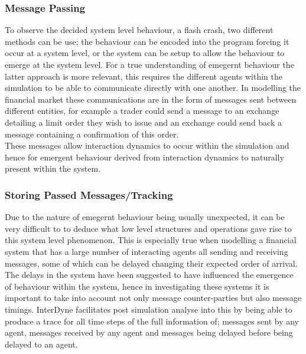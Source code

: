 \documentclass{article}
\begin{document}
\subsubsection{Message Passing}
To observe the decided system level behaviour, a flash crash, two different methods can be use; the behaviour can be encoded into the program forcing it occur at a system level, or the system can be setup to allow the behaviour to emerge at the system level. For a true understanding of emegernt behaviour the latter approach is more relevant, this requires the different agents within the simulation to be able to communicate directly with one another. In modelling the financial market these communications are in the form of messages sent between different entities, for example a trader could send a message to an exchange detailing a limit order they wish to issue and an exchange could send back a message containing a confirmation of this order.\\
These messages allow interaction dynamics to occur within the simulation and hence for emergent behaviour derived from interaction dynamics to naturally present within the system. 




\subsubsection{Storing Passed Messages/Tracking}
Due to the nature of emegernt behaviour being usually unexpected, it can be very difficult to to deduce what low level structures and operations gave rise to this system level phenomenon. This is especially true when modelling a financial system that has a large number of interacting agents all sending and receiving messages, some of which can be delayed changing their expected order of arrival. The delays in the system have been suggested to have influenced the emergence of behaviour within the system, hence in investigating these systems it is important to take into account not only message counter-parties but also message timings. InterDyne facilitates post simulation analyse into this by being able to produce a trace for all time steps of the full information of; messages sent by any agent, messages received by any agent and messages being delayed before being delayed to an agent.          

  
\end{document}
